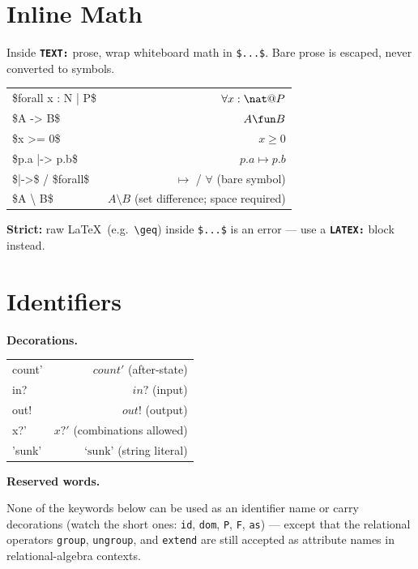 \documentclass[10pt,landscape,a4paper]{article}
\newcommand{\kw}[1]{\texttt{\bfseries #1}}
\begin{document}
\begin{multicols}{2}
\section{Inline Math}

{\footnotesize Inside \kw{TEXT:} prose, wrap whiteboard math in \verb|$...$|. Bare prose is escaped, never converted to symbols.}

\begin{tabularx}{\columnwidth}{LR}
\$forall x : N | P\$ & $\forall x : \nat @ P$ \\
\$A -> B\$           & $A \fun B$ \\
\$x >= 0\$           & $x \geq 0$ \\
\$p.a |-> p.b\$      & $p.a \mapsto p.b$ \\
\$|->\$ / \$forall\$ & $\mapsto$ / $\forall$ (bare symbol) \\
\$A \textbackslash{} B\$ & $A \setminus B$ (set difference; space required) \\
\end{tabularx}

{\footnotesize\textbf{Strict:} raw \LaTeX\ (e.g.\ \texttt{\textbackslash geq}) inside \texttt{\$...\$} is an error --- use a \kw{LATEX:} block instead.}

\section{Identifiers}

\textbf{Decorations.}

\begin{tabularx}{\columnwidth}{LR}
count'               & $count'$ (after-state) \\
in?                  & $in?$ (input) \\
out!                 & $out!$ (output) \\
x?'                  & $x?'$ (combinations allowed) \\
'sunk'               & $\mbox{`sunk'}$ (string literal) \\
\end{tabularx}

\smallskip
{}
\textbf{Reserved words.}

{\footnotesize None of the keywords below can be used as an identifier name or carry decorations (watch the short ones: \texttt{id}, \texttt{dom}, \texttt{P}, \texttt{F}, \texttt{as}) --- except that the relational operators \texttt{group}, \texttt{ungroup}, and \texttt{extend} are still accepted as attribute names in relational-algebra contexts.}


\end{multicols}
\end{document}
